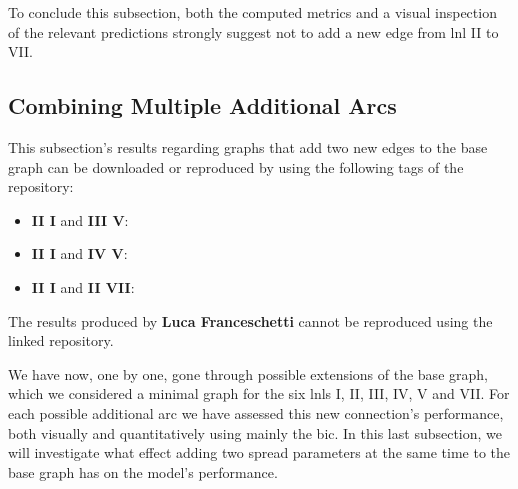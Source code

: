 \documentclass[\relativeRoot/main.tex]{subfiles}
\begin{document}
To conclude this subsection, both the computed metrics and a visual inspection of the relevant predictions strongly suggest not to add a new edge from \gls{lnl} II to VII.

\subsection{Combining Multiple Additional Arcs}
\label{subsec:graph:extended:multiple}



\begin{tcolorbox}[title=\faIcon{recycle} Reproducibility, parbox=false]
    This subsection's results regarding graphs that add two new edges to the base graph can be downloaded or reproduced by using the following tags of the  repository:

    \begin{itemize}
        \item \textbf{II  I} and \textbf{III  V}: 
        \item \textbf{II  I} and \textbf{IV  V}: 
        \item \textbf{II  I} and \textbf{II  VII}: 
    \end{itemize}

    The results produced by  \textbf{Luca Franceschetti} \cite{franceschetti_comparison_2022} cannot be reproduced using the linked repository.
\end{tcolorbox}

We have now, one by one, gone through possible extensions of the base graph, which we considered a minimal graph for the six \glspl{lnl} I, II, III, IV, V and VII. For each possible additional arc we have assessed this new connection's performance, both visually and quantitatively using mainly the \acrlong{bic}. In this last subsection, we will investigate what effect adding two spread parameters at the same time to the base graph has on the model's performance.
\end{document}
